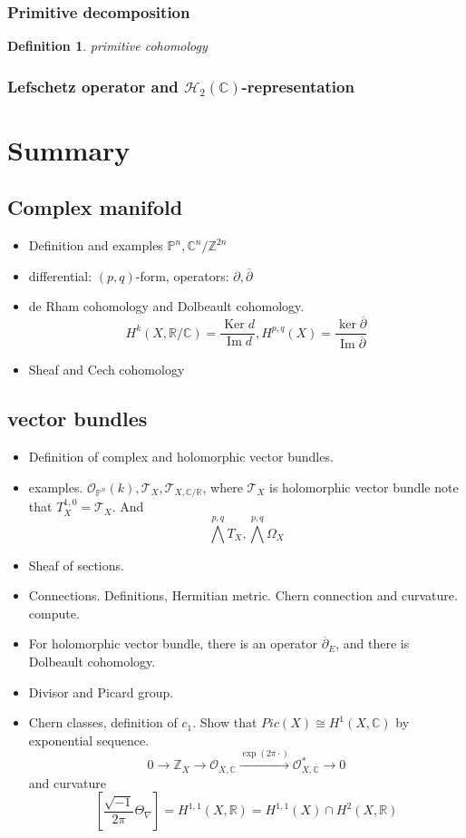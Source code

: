 \documentclass{article}
\newtheorem{definition}{Definition}[subsection]
\begin{document}
\subsubsection{Primitive decomposition}
\begin{definition}
  primitive cohomology
\end{definition}

\subsubsection{Lefschetz operator and $ \mathcal{H_{2}}(\mathbb{C}) $-representation}

\section{Summary}
\subsection{Complex manifold}
\begin{itemize}
  \item Definition and examples $ \mathbb{P}^{n}, \mathbb{C}^{n}/\mathbb{Z}^{2n} $
  \item differential: $ (p,q) $-form, operators: $ \partial, \overline{\partial} $
  \item de Rham cohomology and Dolbeault cohomology.
    \[
    H^{k}(X,\mathbb{R} / \mathbb{C}) = \frac{ \operatorname{Ker}d}{ \operatorname{Im}d}  , H^{p,q}(X)= \frac{ \operatorname{ ker}\overline{\partial}}{ \operatorname{Im} \overline{\partial} }
    \]
  \item Sheaf and Cech cohomology
\end{itemize}
\subsection{vector bundles}
\begin{itemize}
  \item Definition of complex and holomorphic vector bundles.
  \item examples. $ \mathcal{O}_{\mathbb{P}^{n}}(k), \mathcal{T}_{X}, \mathcal{T}_{X,\mathbb{C}/\mathbb{R}} $, where $ \mathcal{T}_{X} $ is holomorphic vector bundle
    note that $ T^{1,0}_{X}=\mathcal{T}_{X} $. And
    \[
      \bigwedge^{p,q}T_{X},\bigwedge^{p,q}\Omega_{X} 
    \]
  \item Sheaf of sections.
  \item Connections. Definitions, Hermitian metric. Chern connection and curvature. compute.
  \item For holomorphic vector bundle, there is an operator $ \overline{\partial}_{E} $, and there is Dolbeault cohomology.
  \item Divisor and Picard group.
  \item Chern classes, definition of $ c_{1} $. Show that $ Pic(X)\cong H^{1}(X,\mathbb{C}) $ by exponential sequence.
    \[
      0\to \mathbb{Z}_{X}\to \mathcal{O}_{X,\mathbb{C}}\xrightarrow{ \exp (2\pi \cdot)} \mathcal{O}_{X,\mathbb{C}}^{*} \to 0
    \]
    and curvature
    \[
      [\frac{\sqrt{-1}}{2\pi}\Theta_{\nabla}] = H^{1,1}(X,\mathbb{R}) = H^{1,1}(X) \cap H^{2}(X,\mathbb{R})
    \]
\end{itemize}
\end{document}
